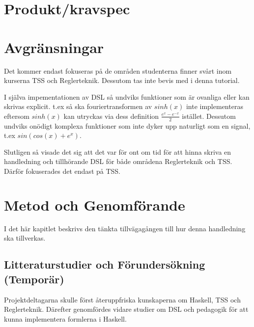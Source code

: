 \documentclass[]{article}
\begin{document}
\section{Produkt/kravspec}

\section{Avgränsningar}

%

Det kommer endast fokuseras på de områden studenterna finner svårt inom
kurserna TSS och Reglerteknik. Dessutom tas inte bevis med i denna tutorial.

I själva impementationen av DSL så undviks funktioner som är
ovanliga eller kan skrivas explicit. t.ex så ska fouriertransformen av
$sinh(x)$ inte implementeras eftersom $sinh(x)$ kan utryckas via dess
definition $\frac{e^{x} - e^{-x}}{2}$ istället.
Dessutom undviks onödigt komplexa funktioner som inte
dyker upp naturligt som en signal, t.ex $sin(cos(x)+e^x)$.

Slutligen så visade det sig att det var för ont om tid för att hinna
skriva en handledning och tillhörande DSL för både områdena Reglerteknik och TSS.
Därför fokuserades det endast på TSS.

\section{Metod och Genomförande}


I det här kapitlet beskrivs den tänkta tillvägagången till hur denna
handledning ska tillverkas.

\subsection{Litteraturstudier och Förundersökning (Temporär)}


Projektdeltagarna skulle först återuppfriska kunskaperna om Haskell, TSS
och Reglerteknik. Därefter genomfördes vidare studier om DSL och pedagogik för
att kunna implementera formlerna i Haskell.
\end{document}
